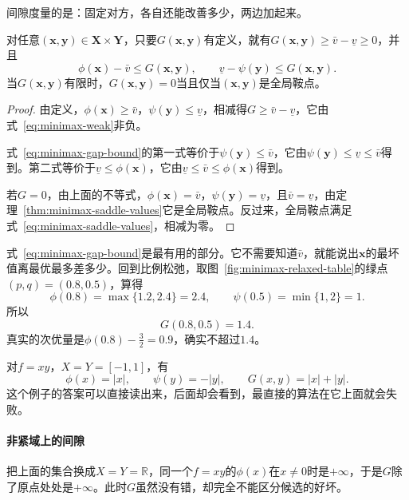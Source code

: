 间隙度量的是：固定对方，各自还能改善多少，两边加起来。

\begin{theorem}[间隙是全局证书]
\label{thm:minimax-gap}
对任意$(\bm{x},\bm{y})\in\bm{X}\times\bm{Y}$，只要$G(\bm{x},\bm{y})$有定义，就有$G(\bm{x},\bm{y})\geq\bar{v}-\underline{v}\geq0$，并且
\begin{equation}
 \phi(\bm{x})-\bar{v}\leq G(\bm{x},\bm{y}),\qquad\underline{v}-\psi(\bm{y})\leq G(\bm{x},\bm{y}).
 \label{eq:minimax-gap-bound}
\end{equation}
当$G(\bm{x},\bm{y})$有限时，$G(\bm{x},\bm{y})=0$当且仅当$(\bm{x},\bm{y})$是全局鞍点。
\end{theorem}

\begin{proof}
由定义，$\phi(\bm{x})\geq\bar{v}$，$\psi(\bm{y})\leq\underline{v}$，相减得$G\geq\bar{v}-\underline{v}$，它由式~\eqref{eq:minimax-weak}非负。

式~\eqref{eq:minimax-gap-bound}的第一式等价于$\psi(\bm{y})\leq\bar{v}$，它由$\psi(\bm{y})\leq\underline{v}\leq\bar{v}$得到。第二式等价于$\underline{v}\leq\phi(\bm{x})$，它由$\underline{v}\leq\bar{v}\leq\phi(\bm{x})$得到。

若$G=0$，由上面的不等式，$\phi(\bm{x})=\bar{v}$，$\psi(\bm{y})=\underline{v}$，且$\bar{v}=\underline{v}$，由定理~\ref{thm:minimax-saddle-values}它是全局鞍点。反过来，全局鞍点满足式~\eqref{eq:minimax-saddle-values}，相减为零。
\end{proof}

式~\eqref{eq:minimax-gap-bound}是最有用的部分。它不需要知道$\bar{v}$，就能说出$\bm{x}$的最坏值离最优最多差多少。回到比例松弛，取图~\ref{fig:minimax-relaxed-table}的绿点$(p,q)=(0.8,0.5)$，算得
\[
 \phi(0.8)=\max\{1.2,2.4\}=2.4,\qquad\psi(0.5)=\min\{1,2\}=1.
\]
所以
\[
 G(0.8,0.5)=1.4.
\]
真实的次优量是$\phi(0.8)-\frac32=0.9$，确实不超过$1.4$。

对$f=xy$，$X=Y=[-1,1]$，有
\begin{equation}
 \phi(x)=\lvert x\rvert,\qquad\psi(y)=-\lvert y\rvert,\qquad G(x,y)=\lvert x\rvert+\lvert y\rvert.
 \label{eq:minimax-box-gap}
\end{equation}
这个例子的答案可以直接读出来，后面却会看到，最直接的算法在它上面就会失败。

\paragraph{非紧域上的间隙}
把上面的集合换成$X=Y=\mathbb{R}$，同一个$f=xy$的$\phi(x)$在$x\neq0$时是$+\infty$，于是$G$除了原点处处是$+\infty$。此时$G$虽然没有错，却完全不能区分候选的好坏。

